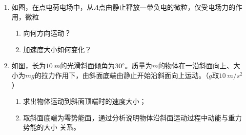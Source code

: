 \begin{enumerate}
\item 
如图，在点电荷电场中，从$ A $点由静止释放一带负电的微粒，仅受电场力的作用，微粒
\begin{enumerate}
	\item
向何方向运动？
\item 
加速度大小如何变化？
\end{enumerate}
\begin{figure}[h!]
	\flushright 
	
\end{figure}




\item 
如图，长为$ 10 \ m $的光滑斜面倾角为$ 30 \degree $。质量为$ m $的物体在一沿斜面向上、大小为$ mg $的拉力作用下，由斜面底端由静止开始沿斜面向上运动。（$ g $取$ 10 \ m/s^{2} $）
\begin{enumerate}
	\item
求出物体运动到斜面顶端时的速度大小；
\item 
取斜面底端为零势能面，通过分析说明物体沿斜面运动过程中动能与重力势能的大小
关系。

\end{enumerate}
\begin{figure}[h!]
	\flushright
	
\end{figure}




	
\end{enumerate}


